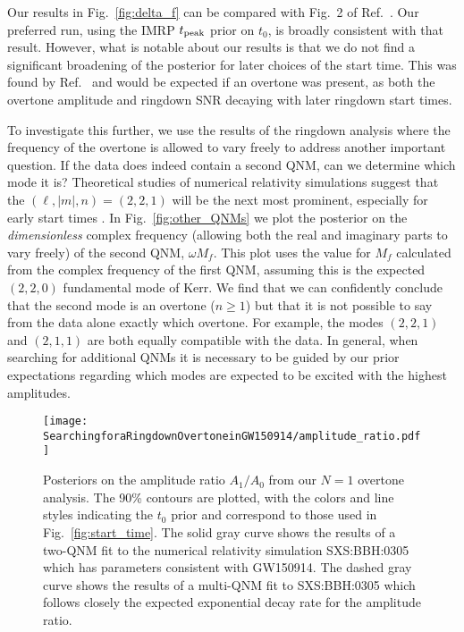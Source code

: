 Our results in Fig.~\ref{fig:delta_f} can be compared with Fig.~2 of Ref.~\cite{Isi:2022mhy}. 
Our preferred run, using the IMRP $t_{\rm peak}$ prior on $t_0$, is broadly consistent with that result.
However, what is notable about our results is that we do not find a significant broadening of the posterior for later choices of the start time. 
This was found by Ref.~\cite{Isi:2022mhy} and would be expected if an overtone was present, as both the overtone amplitude and ringdown SNR decaying with later ringdown start times.

To investigate this further, we use the results of the ringdown analysis where the frequency of the overtone is allowed to vary freely to address another important question. 
If the data does indeed contain a second QNM, can we determine which mode it is?
Theoretical studies of numerical relativity simulations suggest that the $(\ell,|m|,n)=(2,2,1)$ will be the next most prominent, especially for early start times \cite{Giesler:2019uxc}. 
In Fig.~\ref{fig:other_QNMs} we plot the posterior on the \emph{dimensionless} complex frequency (allowing both the real and imaginary parts to vary freely) of the second QNM, $\omega M_f$.
This plot uses the value for $M_f$ calculated from the complex frequency of the first QNM, assuming this is the expected $(2,2,0)$ fundamental mode of Kerr.
We find that we can confidently conclude that the second mode is an overtone ($n\geq 1$) but that it is not possible to say from the data alone exactly which overtone. 
For example, the modes $(2,2,1)$ and $(2,1,1)$ are both equally compatible with the data. 
In general, when searching for additional QNMs it is necessary to be guided by our prior expectations regarding which modes are expected to be excited with the highest amplitudes.

\begin{figure}[t]
	\texttt{[image: SearchingforaRingdownOvertoneinGW150914/amplitude\_ratio.pdf]}
	\caption[Posteriors on the amplitude ratio $A_1/A_0$ from the GW150914 overtone analysis]{ 
		Posteriors on the amplitude ratio $A_1/A_0$ from our $N=1$ overtone analysis. 
		The 90\% contours are plotted, with the colors and line styles indicating the $t_0$ prior and correspond to those used in Fig.~\ref{fig:start_time}.
		The solid gray curve shows the results of a two-QNM fit to the numerical relativity simulation SXS:BBH:0305 which has parameters consistent with GW150914.
		The dashed gray curve shows the results of a multi-QNM fit to SXS:BBH:0305 which follows closely the expected exponential decay rate for the amplitude ratio.
	}
	\label{fig:amp_ratio}
\end{figure}

